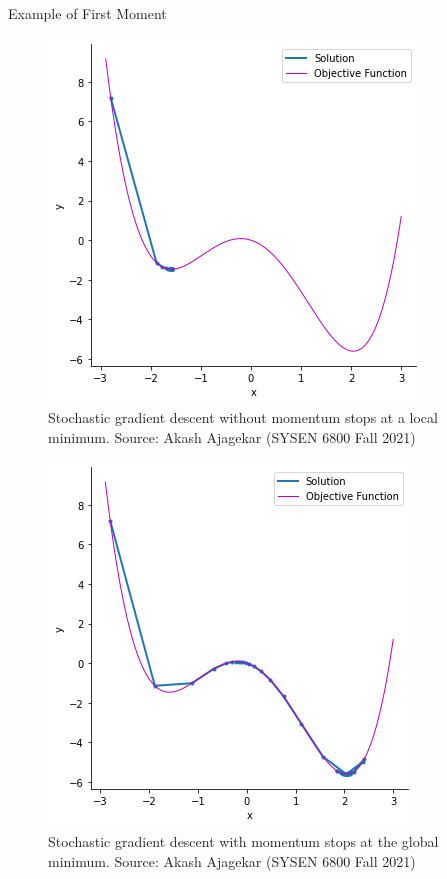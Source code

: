 \documentclass[serif, aspectratio=169]{beamer}
\begin{document}
\begin{frame}{Example of First Moment}
    \begin{minipage}{0.45\linewidth}
        \begin{figure}
            \centering
            \includegraphics[width=0.75\linewidth]{pic/Without_momentum.png}
            \caption{\footnotesize Stochastic gradient descent without momentum stops at a local minimum. Source: Akash Ajagekar (SYSEN 6800 Fall 2021)}
        \end{figure}
    \end{minipage}%
    \begin{minipage}{0.45\linewidth}
        \begin{figure}
            \centering
            \includegraphics[width=0.75\linewidth]{pic/With_momentum.png}
            \caption{\footnotesize Stochastic gradient descent with momentum stops at the global minimum. Source: Akash Ajagekar (SYSEN 6800 Fall 2021)}
        \end{figure}
    \end{minipage}
\end{frame}
\end{document}
